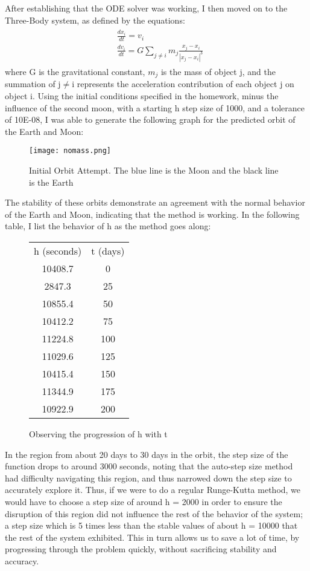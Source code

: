 \documentclass[11pt,letterpaper]{article}
\begin{document}
After establishing that the ODE solver was working, I then moved on to the Three-Body system, as defined by the equations:
\begin{eqnarray}
\begin{aligned}
&\frac{dx_i}{dt} = v_i\\
&\frac{dv_i}{dt} = G\sum_{j\neq i}m_j\frac{x_j - x_i}{|x_j - x_i|^3}
\end{aligned}
\end{eqnarray}
where G is the gravitational constant, $m_j$ is the mass of object j, and the summation of j$\neq$i represents the acceleration contribution of each object j on object i.
Using the initial conditions specified in the homework, minus the influence of the second moon, with a starting h step size of 1000, and a tolerance of 10E-08, I was able to generate the following graph for the predicted orbit of the Earth and Moon:
\begin{figure}[htb!]
\begin{center}
\leavevmode
\texttt{[image: nomass.png]}
\end{center}
\caption{Initial Orbit Attempt. The blue line is the Moon and the black line is the Earth}
\label{fbigh}
\end{figure}

The stability of these orbits demonstrate an agreement with the normal behavior of the Earth and Moon, indicating that the method is working. In the following table, I list the behavior of h as the method goes along:
\begin{figure}[htb!]
\begin{center}
\leavevmode
\begin{tabular}{ c c }
h (seconds)	&	t (days)	\\
10408.7	&	0	\\
2847.3	&	25	\\
10855.4	&	50	\\
10412.2	&	75	\\
11224.8	&	100	\\
11029.6	&	125	\\
10415.4	&	150	\\
11344.9	&	175	\\
10922.9	&	200	\\
\end{tabular}
\end{center}
\caption{Observing the progression of h with t}
\label{fbigh}
\end{figure}

In the region from about 20 days to 30 days in the orbit, the step size of the function drops to around 3000 seconds, noting that the auto-step size method had difficulty navigating this region, and thus narrowed down the step size to accurately explore it. Thus, if we were to do a regular Runge-Kutta method, we would have to choose a step size of around h = 2000 in order to ensure the disruption of this region did not influence the rest of the behavior of the system; a step size which is 5 times less than the stable values of about h = 10000 that the rest of the system exhibited. This in turn allows us to save a lot of time, by progressing through the problem quickly, without sacrificing stability and accuracy.\\
\end{document}
